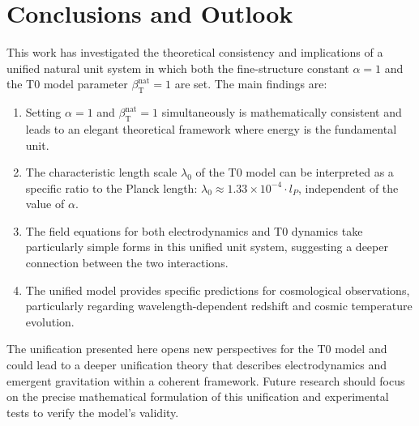 \documentclass[12pt,a4paper]{article}
\newcommand{\betaT}{\beta_{\text{T}}}
\begin{document}
	\section{Conclusions and Outlook}
	
	This work has investigated the theoretical consistency and implications of a unified natural unit system in which both the fine-structure constant \(\alpha = 1\) and the T0 model parameter \(\betaT^{\text{nat}} = 1\) are set. The main findings are:
	
	\begin{enumerate}
		\item Setting \(\alpha = 1\) and \(\betaT^{\text{nat}} = 1\) simultaneously is mathematically consistent and leads to an elegant theoretical framework where energy is the fundamental unit.
		\item The characteristic length scale \(\lambda_0\) of the T0 model can be interpreted as a specific ratio to the Planck length: \(\lambda_0 \approx 1.33 \times 10^{-4} \cdot l_P\), independent of the value of \(\alpha\).
		\item The field equations for both electrodynamics and T0 dynamics take particularly simple forms in this unified unit system, suggesting a deeper connection between the two interactions.
		\item The unified model provides specific predictions for cosmological observations, particularly regarding wavelength-dependent redshift and cosmic temperature evolution.
	\end{enumerate}
	
	The unification presented here opens new perspectives for the T0 model and could lead to a deeper unification theory that describes electrodynamics and emergent gravitation within a coherent framework. Future research should focus on the precise mathematical formulation of this unification and experimental tests to verify the model's validity.
	
\end{document}

